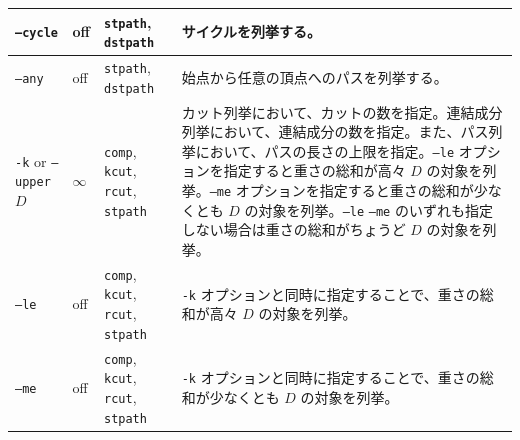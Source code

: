 \documentclass{jsarticle}
\begin{document}
\begin{table}
\begin{center}
\begin{tabular}[t]{|p{120pt}|p{50pt}|p{80pt}|p{180pt}|}
\texttt{--cycle} & off & \texttt{stpath}, \texttt{dstpath} & サイクルを列挙する。 \\ \hline
\texttt{--any} & off & \texttt{stpath}, \texttt{dstpath} & 始点から任意の頂点へのパスを列挙する。 \\ \hline
\texttt{-k} or \texttt{--upper} $D$ & $\infty$ & \texttt{comp}, \texttt{kcut}, \texttt{rcut}, \texttt{stpath} & カット列挙において、カットの数を指定。連結成分列挙において、連結成分の数を指定。また、パス列挙において、パスの長さの上限を指定。\texttt{--le} オプションを指定すると重さの総和が高々 $D$ の対象を列挙。\texttt{--me} オプションを指定すると重さの総和が少なくとも $D$ の対象を列挙。\texttt{--le}  \texttt{--me} のいずれも指定しない場合は重さの総和がちょうど $D$ の対象を列挙。 \\ \hline
\texttt{--le} & off & \texttt{comp}, \texttt{kcut}, \texttt{rcut}, \texttt{stpath} & \texttt{-k} オプションと同時に指定することで、重さの総和が高々 $D$ の対象を列挙。 \\ \hline
\texttt{--me} & off & \texttt{comp}, \texttt{kcut}, \texttt{rcut}, \texttt{stpath} & \texttt{-k} オプションと同時に指定することで、重さの総和が少なくとも $D$ の対象を列挙。 \\ \hline
\end{tabular}
\end{center}
\end{table}
\end{document}
